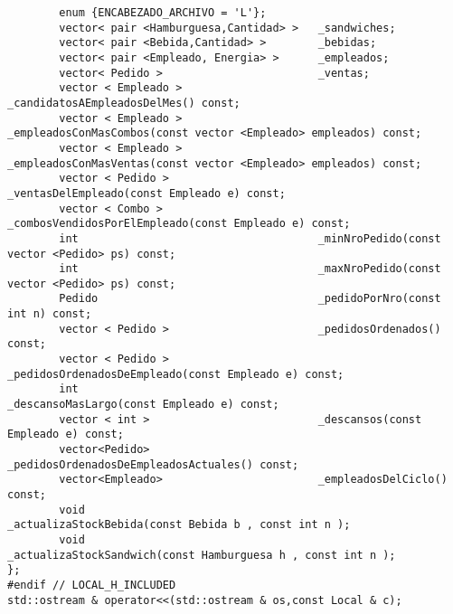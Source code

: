 \begin{lstlisting}
        enum {ENCABEZADO_ARCHIVO = 'L'};
        vector< pair <Hamburguesa,Cantidad> >   _sandwiches;
        vector< pair <Bebida,Cantidad> >        _bebidas;
        vector< pair <Empleado, Energia> >      _empleados;
        vector< Pedido >                        _ventas;
        vector < Empleado >                     _candidatosAEmpleadosDelMes() const;
        vector < Empleado >                     _empleadosConMasCombos(const vector <Empleado> empleados) const;
        vector < Empleado >                     _empleadosConMasVentas(const vector <Empleado> empleados) const;
        vector < Pedido >                       _ventasDelEmpleado(const Empleado e) const;
        vector < Combo >                        _combosVendidosPorElEmpleado(const Empleado e) const;
        int                                     _minNroPedido(const vector <Pedido> ps) const;
        int                                     _maxNroPedido(const vector <Pedido> ps) const;
        Pedido                                  _pedidoPorNro(const int n) const;
        vector < Pedido >                       _pedidosOrdenados() const;
        vector < Pedido >                       _pedidosOrdenadosDeEmpleado(const Empleado e) const;
        int                                     _descansoMasLargo(const Empleado e) const;
        vector < int >                          _descansos(const Empleado e) const;
        vector<Pedido>                          _pedidosOrdenadosDeEmpleadosActuales() const;
        vector<Empleado>                        _empleadosDelCiclo() const;
        void                                    _actualizaStockBebida(const Bebida b , const int n );
        void                                    _actualizaStockSandwich(const Hamburguesa h , const int n );
};
#endif // LOCAL_H_INCLUDED
std::ostream & operator<<(std::ostream & os,const Local & c);

\end{lstlisting}